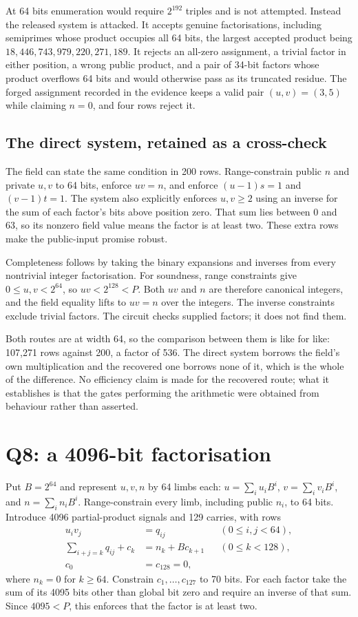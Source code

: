 \documentclass[11pt,a4paper]{article}
\begin{document}
At 64 bits enumeration would require $2^{192}$ triples and is not attempted.
Instead the released system is attacked. It accepts genuine factorisations,
including semiprimes whose product occupies all 64 bits, the largest accepted
product being $18{,}446{,}743{,}979{,}220{,}271{,}189$. It rejects an all-zero
assignment, a trivial factor in either position, a wrong public product, and a
pair of 34-bit factors whose product overflows 64 bits and would otherwise pass
as its truncated residue. The forged assignment recorded in the evidence keeps a
valid pair $(u,v)=(3,5)$ while claiming $n=0$, and four rows reject it.

\subsection{The direct system, retained as a cross-check}
The field can state the same condition in 200 rows. Range-constrain public $n$
and private $u,v$ to 64 bits, enforce $uv=n$, and enforce $(u-1)s=1$ and
$(v-1)t=1$. The system also explicitly enforces $u,v\ge2$ using an inverse for
the sum of each factor's bits above position zero. That sum lies between 0 and
63, so its nonzero field value means the factor is at least two. These extra
rows make the public-input promise robust.

Completeness follows by taking the binary expansions and inverses from every
nontrivial integer factorisation. For soundness, range constraints give
$0\le u,v<2^{64}$, so $uv<2^{128}<P$. Both $uv$ and $n$ are therefore
canonical integers, and the field equality lifts to $uv=n$ over the integers.
The inverse constraints exclude trivial factors. The circuit checks supplied
factors; it does not find them.

Both routes are at width 64, so the comparison between them is like for like:
107{,}271 rows against 200, a factor of 536. The direct system borrows the
field's own multiplication and the recovered one borrows none of it, which is
the whole of the difference. No efficiency claim is made for the recovered
route; what it establishes is that the gates performing the arithmetic were
obtained from behaviour rather than asserted.

\section{Q8: a 4096-bit factorisation}
Put $B=2^{64}$ and represent $u,v,n$ by 64 limbs each:
$u=\sum_i u_iB^i$, $v=\sum_i v_iB^i$, and $n=\sum_i n_iB^i$.
Range-constrain every limb, including public $n_i$, to 64 bits. Introduce 4096
partial-product signals and 129 carries, with rows
\begin{align*}
 u_iv_j&=q_{ij} &&(0\le i,j<64),\\
 \sum_{i+j=k}q_{ij}+c_k&=n_k+Bc_{k+1} &&(0\le k<128),\\
 c_0&=c_{128}=0,
\end{align*}
where $n_k=0$ for $k\ge64$. Constrain $c_1,\ldots,c_{127}$ to 70 bits.
For each factor take the sum of its 4095 bits other than global bit zero and
require an inverse of that sum. Since $4095<P$, this enforces that the factor
is at least two.
\end{document}
